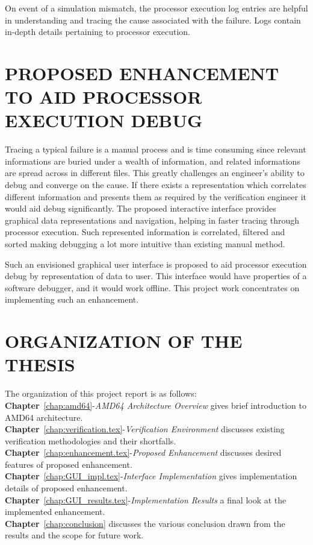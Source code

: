 On event of a simulation mismatch, the processor execution log entries are helpful in understanding and tracing the cause associated with the failure. Logs contain in-depth details pertaining to processor execution. 

\section{PROPOSED ENHANCEMENT TO AID PROCESSOR EXECUTION DEBUG}
Tracing a typical failure is a manual process and is time consuming since relevant informations are buried under a wealth of information, and related informations are spread across in different files. This greatly challenges an engineer's ability to debug and converge on the cause. If there exists a representation which correlates different information and presents them as required by the verification engineer it would aid debug significantly. The proposed interactive interface provides graphical data representations and navigation, helping in faster tracing through processor execution. Such represented information is correlated, filtered and sorted making debugging a lot more intuitive than existing manual method.


Such an envisioned graphical user interface is proposed to aid processor execution debug by representation of data to user. This interface would have properties of a software debugger, and it would work offline. This project work concentrates on implementing such an enhancement.

 


\section{ORGANIZATION OF THE THESIS}
The organization of this project report is as follows:\\
\noindent 
{\bf Chapter}~\ref{chap:amd64}-{\it AMD64 Architecture Overview} gives brief introduction to AMD64 architecture.\\
{\bf Chapter}~\ref{chap:verification.tex}-{\it Verification Environment} discusses existing verification methodologies and their shortfalls.\\
{\bf Chapter}~\ref{chap:enhancement.tex}-{\it Proposed Enhancement} discusses desired features of proposed enhancement.\\
{\bf Chapter}~\ref{chap:GUI_impl.tex}-{\it Interface Implementation} gives implementation details of proposed enhancement.\\
{\bf Chapter}~\ref{chap:GUI_results.tex}-{\it Implementation Results} a final look at the implemented enhancement.\\
{\bf Chapter}~\ref{chap:conclusion} discusses the various conclusion drawn from the results and the scope for future work.

